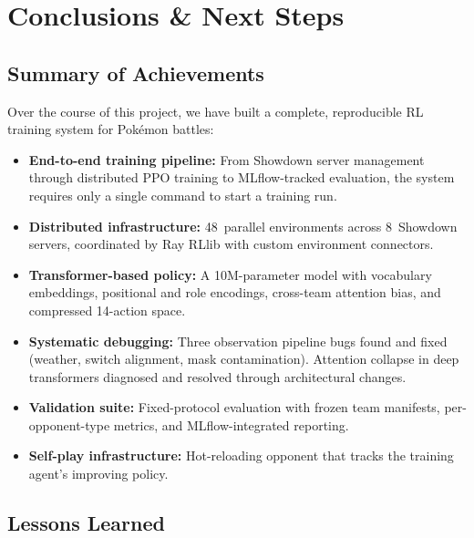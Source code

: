 \chapter{Conclusions \& Next Steps}
\label{ch:conclusions}

\section{Summary of Achievements}

Over the course of this project, we have built a complete, reproducible RL
training system for Pok\'{e}mon battles:

\begin{itemize}
  \item \textbf{End-to-end training pipeline:} From Showdown server management
        through distributed PPO training to MLflow-tracked evaluation, the
        system requires only a single command to start a training run.
  \item \textbf{Distributed infrastructure:} 48~parallel environments across
        8~Showdown servers, coordinated by Ray RLlib with custom environment
        connectors.
  \item \textbf{Transformer-based policy:} A 10M-parameter model with
        vocabulary embeddings, positional and role encodings, cross-team
        attention bias, and compressed 14-action space.
  \item \textbf{Systematic debugging:} Three observation pipeline bugs found
        and fixed (weather, switch alignment, mask contamination).  Attention
        collapse in deep transformers diagnosed and resolved through
        architectural changes.
  \item \textbf{Validation suite:} Fixed-protocol evaluation with frozen team
        manifests, per-opponent-type metrics, and MLflow-integrated reporting.
  \item \textbf{Self-play infrastructure:} Hot-reloading opponent that tracks
        the training agent's improving policy.
\end{itemize}

\section{Lessons Learned}

